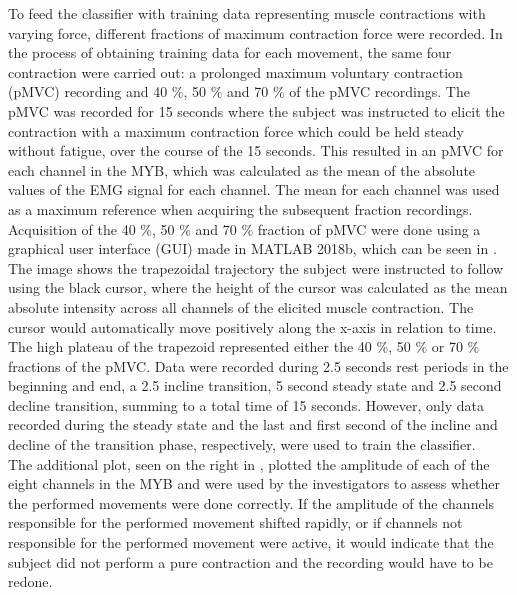 To feed the classifier with training data representing muscle contractions with varying force, different fractions of maximum contraction force were recorded. In the process of obtaining training data for each movement, the same four contraction were carried out: a prolonged maximum voluntary contraction (pMVC) recording and 40 $\percent$, 50 $\percent$ and 70 $\percent$ of the pMVC recordings.
The pMVC was recorded for 15 seconds where the subject was instructed to elicit the contraction with a maximum contraction force which could be held steady without fatigue, over the course of the 15 seconds. This resulted in an pMVC for each channel in the MYB, which was calculated as the mean of the absolute values of the EMG signal for each channel. The mean for each channel was used as a maximum reference when acquiring the subsequent fraction recordings. \\
Acquisition of the 40 $\percent$, 50 $\percent$ and 70 $\percent$ fraction of pMVC were done using a graphical user interface (GUI) made in MATLAB 2018b, which can be seen in . The image shows the trapezoidal trajectory the subject were instructed to follow using the black cursor, where the height of the cursor was calculated as the mean absolute intensity across all channels of the elicited muscle contraction. The cursor would automatically move positively along the x-axis in relation to time. The high plateau of the trapezoid represented either the 40 $\percent$, 50 $\percent$ or 70 $\percent$ fractions of the pMVC. Data were recorded during 2.5 seconds rest periods in the beginning and end, a 2.5 incline transition, 5 second steady state and 2.5 second decline transition, summing to a total time of 15 seconds. However, only data recorded during the steady state and the last and first second of the incline and decline of the transition phase, respectively, were used to train the classifier. \\
The additional plot, seen on the right in , plotted the amplitude of each of the eight channels in the MYB and were used by the investigators to assess whether the performed movements were done correctly. If the amplitude of the channels responsible for the performed movement shifted rapidly, or if channels not responsible for the performed movement were active, it would indicate that the subject did not perform a pure contraction and the recording would have to be redone.   
   
   
